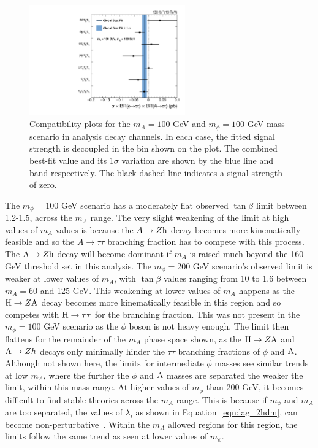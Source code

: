 \begin{figure}[!hbtp]
\centering
    \includegraphics[width=0.6\textwidth]{Figures/ChannelCompatibilityCheck_FitResults_mphi100mA100_channel.pdf}
\caption[Plot of the compatibility of the model-independent results across $\tau\tau\tau\tau$ decay channels.]{Compatibility plots for the $m_{A}=100$ GeV and $m_{\phi}=100$ GeV mass scenario in analysis decay channels. In each case, the fitted signal strength is decoupled in the bin shown on the plot. The combined best-fit value and its 1$\sigma$ variation are shown by the blue line and band respectively. The black dashed line indicates a signal strength of zero.}
\label{fig:4tau_ccc}
\end{figure}

The $m_{\phi} = 100$ GeV scenario has a moderately flat observed $\tan\beta$ limit between 1.2-1.5, across the $m_{A}$ range.
The very slight weakening of the limit at high values of $m_{A}$ values is because the $A\rightarrow Z{\text{h}}$ decay becomes more kinematically feasible and so the $A\rightarrow\tau\tau$ branching fraction has to compete with this process.
The ${\text{A}}\rightarrow Z{\text{h}}$ decay will become dominant if $m_{A}$ is raised much beyond the 160 GeV threshold set in this analysis.
The $m_{\phi} = 200$ GeV scenario's observed limit is weaker at lower values of $m_{A}$, with $\tan\beta$ values ranging from 10 to 1.6 between $m_{A} = 60$ and 125 GeV.
This weakening at lower values of $m_{A}$ happens as the ${\text{H}}\rightarrow Z{\text{A}}$ decay becomes more kinematically feasible in this region and so competes with ${\text{H}}\rightarrow\tau\tau$ for the branching fraction.
This was not present in the $m_{\phi}=100$ GeV scenario as the $\phi$ boson is not heavy enough.
The limit then flattens for the remainder of the $m_{A}$ phase space shown, as the ${\text{H}}\rightarrow Z{\text{A}}$ and ${\text{A}}\rightarrow Zh$ decays only minimally hinder the $\tau\tau$ branching fractions of $\phi$ and ${\text{A}}$. \\

Although not shown here, the limits for intermediate $\phi$ masses see similar trends at low $m_{A}$, where the further the $\phi$ and ${\text{A}}$ masses are separated the weaker the limit, within this mass range.
At higher values of $m_\phi$ than 200 GeV, it becomes difficult to find stable theories across the $m_{A}$ range. 
This is because if $m_\phi$ and $m_{A}$ are too separated, the values of $\lambda_i$ as shown in Equation~\ref{eqn:lag_2hdm}, can become non-perturbative~\cite{Jueid:2021avn}.
Within the $m_{A}$ allowed regions for this region, the limits follow the same trend as seen at lower values of $m_{\phi}$. \\

